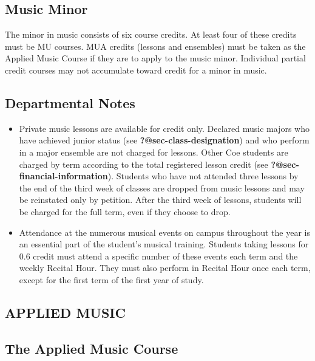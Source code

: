 \documentclass[
  letterpaper,
]{scrbook}
\providecommand{\tightlist}{%
  \setlength{\itemsep}{0pt}\setlength{\parskip}{0pt}}
\begin{document}
\subsection{Music Minor}\label{music-minor}

The minor in music consists of six course credits. At least four of
these credits must be MU courses. MUA credits (lessons and ensembles)
must be taken as the Applied Music Course if they are to apply to the
music minor. Individual partial credit courses may not accumulate toward
credit for a minor in music.

\subsection{Departmental Notes}\label{departmental-notes}

\begin{itemize}
\tightlist
\item
  Private music lessons are available for credit only. Declared music
  majors who have achieved junior status (see
  \textbf{?@sec-class-designation}) and who perform in a major ensemble
  are not charged for lessons. Other Coe students are charged by term
  according to the total registered lesson credit (see
  \textbf{?@sec-financial-information}). Students who have not attended
  three lessons by the end of the third week of classes are dropped from
  music lessons and may be reinstated only by petition. After the third
  week of lessons, students will be charged for the full term, even if
  they choose to drop.
\item
  Attendance at the numerous musical events on campus throughout the
  year is an essential part of the student's musical training. Students
  taking lessons for 0.6 credit must attend a specific number of these
  events each term and the weekly Recital Hour. They must also perform
  in Recital Hour once each term, except for the first term of the first
  year of study.
\end{itemize}

\subsection{APPLIED MUSIC}\label{applied-music}

\subsection{The Applied Music Course}\label{the-applied-music-course}
\end{document}

